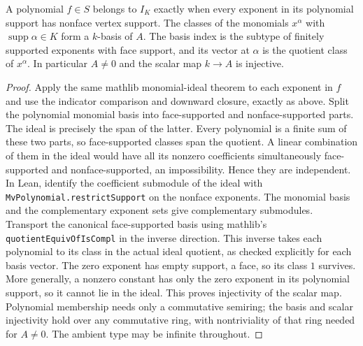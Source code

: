 \begin{proposition}\label{prop:basis}
\leanok
A polynomial $f\in S$ belongs to $I_K$ exactly when every exponent in its
polynomial support has nonface vertex support. The classes of the monomials
$x^\alpha$ with $\operatorname{supp}\alpha\in K$ form a $k$-basis of $A$.
The basis index is the subtype of finitely supported exponents with
face support, and its vector at $\alpha$ is the quotient class of
$x^\alpha$. In particular $A\ne0$ and the scalar map $k\longrightarrow A$
is injective.
\end{proposition}
\begin{proof}
\leanok
Apply the same mathlib monomial-ideal theorem to each exponent in $f$ and
use the indicator comparison and downward closure, exactly as above.
Split the polynomial monomial basis into face-supported and nonface-supported
parts. The ideal is precisely the span of the latter. Every polynomial is a
finite sum of these two parts, so face-supported classes span the quotient.
A linear combination of them in the ideal would have all its nonzero
coefficients simultaneously face-supported and nonface-supported, an
impossibility. Hence they are independent. In Lean, identify the coefficient
submodule of the ideal with \texttt{MvPolynomial.restrictSupport} on the
nonface exponents. The monomial basis and the complementary exponent sets
give complementary submodules. Transport the canonical face-supported basis
using mathlib's \texttt{quotientEquivOfIsCompl} in the inverse direction.
This inverse takes each polynomial
to its class in the actual ideal quotient, as checked explicitly for each
basis vector.
The zero exponent has empty support, a face, so its class $1$ survives.
More generally, a nonzero constant has only the zero exponent in its
polynomial support, so it cannot lie in the ideal. This proves injectivity
of the scalar map. Polynomial membership needs only a commutative semiring;
the basis and scalar injectivity hold over any commutative ring, with
nontriviality of that ring needed for $A\ne0$. The ambient type may be
infinite throughout.
\end{proof}

